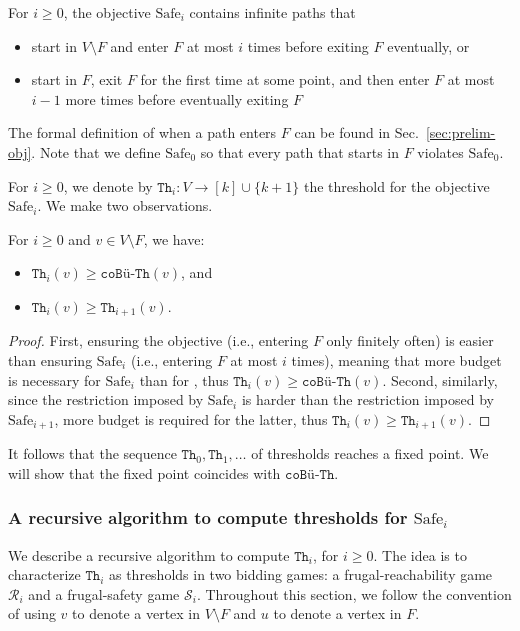 \documentclass{theoretics}
\newcommand{\R}{{\mathcal R}}
\renewcommand{\S}{{\mathcal S}}
\newcommand{\notF}{V \setminus F}
\newcommand{\thresh}{\texttt{Th}\xspace}
\newcommand{\coTh}{\texttt{coB\"u-Th}}
\newcommand{\safe}{\text{Safe}}
\newcommand{\coBuchi}{\text{co-B\"uchi}\xspace}
\begin{document}
\begin{definition}
For $i \geq 0$, the objective $\safe_i$ contains infinite paths that 
\begin{itemize}
\item start in $V \setminus F$ and enter $F$ at most $i$ times before exiting \(F\) eventually, or
\item start in $F$, exit $F$ for the first time at some point, and then enter $F$ at most $i-1$ more times before eventually exiting \(F\)
\end{itemize}
\end{definition}
The formal definition of when a path enters $F$ can be found in Sec.~\ref{sec:prelim-obj}. Note that we define $\safe_0$ so that every path that starts in $F$ violates $\safe_0$.

For $i \geq 0$, we denote by $\thresh_i: V \rightarrow [k] \cup \{k+1\}$ the threshold for the objective $\safe_i$. We make two observations. 

\begin{observation}
\label{obs:Buchi}
For $i \geq 0$ and $v \in \notF$, we have:
\begin{itemize}
\item $\thresh_i(v) \geq \coTh(v)$, and  
\item $\thresh_i(v) \geq \thresh_{i+1}(v)$.
\end{itemize}
\end{observation}
\begin{proof}
First, ensuring the \coBuchi objective (i.e., entering $F$ only finitely often) is easier than ensuring $\safe_i$ (i.e., entering $F$ at most $i$ times), meaning that more budget is necessary for $\safe_i$ than for \coBuchi, thus $\thresh_i(v) \geq \coTh(v)$. Second, similarly, since the restriction imposed by $\safe_i$ is harder than the restriction imposed by $\safe_{i+1}$, more budget is required for the latter, thus $\thresh_i(v) \geq \thresh_{i+1}(v)$.
\end{proof}


It follows that the sequence $\thresh_0,\thresh_1,\ldots$ of thresholds reaches a fixed point. We will show that the fixed point coincides with $\coTh$. 





\subsubsection{A recursive algorithm to compute thresholds for $\safe_i$}
We describe a recursive algorithm to compute $\thresh_i$, for $i \geq 0$. The idea is to characterize $\thresh_i$ as thresholds in two bidding games: a frugal-reachability game $\R_i$ and a frugal-safety game $\S_i$. Throughout this section, we follow the convention of using $v$ to denote a vertex in $V \setminus F$ and $u$ to denote a vertex in $F$. 
\end{document}
